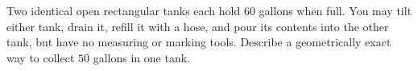 Two identical open rectangular tanks each hold $60$ gallons when full. You may tilt either tank, drain it, refill it with a hose, and pour its contents into the other tank, but have no measuring or marking tools. Describe a geometrically exact way to collect $50$ gallons in one tank.
